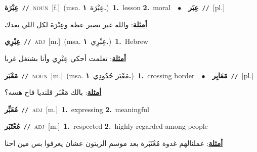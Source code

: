 \documentclass[10pt,a4paper,twoside]{article} %
\begin{document}
\begin{multicols}{2}
{\setlength\topsep{0pt}\textbf{\foreignlanguage{arabic}{عِبْرَة}}\ {\color{gray}\texttt{//}\color{black}}\ \textsc{noun}\ [f.]\ \color{gray}(msa. \foreignlanguage{arabic}{عِبْرَة}~\foreignlanguage{arabic}{\textbf{١.}})\color{black}\ \textbf{1.}~lesson  \textbf{2.}~moral\ \ $\bullet$\ \ \setlength\topsep{0pt}\textbf{\foreignlanguage{arabic}{عِبَر}}\ {\color{gray}\texttt{//}\color{black}}\ [pl.]\  \begin{flushright}\color{gray}\foreignlanguage{arabic}{\textbf{\underline{\foreignlanguage{arabic}{أمثلة}}}: والله غير تصير عظة وعِبْرَة لكل اللي بعدك}\end{flushright}\color{black}} \vspace{2mm}

{\setlength\topsep{0pt}\textbf{\foreignlanguage{arabic}{عِبْرِي}}\ {\color{gray}\texttt{//}\color{black}}\ \textsc{adj}\ [m.]\ \color{gray}(msa. \foreignlanguage{arabic}{عِبْرِي}~\foreignlanguage{arabic}{\textbf{١.}})\color{black}\ \textbf{1.}~Hebrew\  \begin{flushright}\color{gray}\foreignlanguage{arabic}{\textbf{\underline{\foreignlanguage{arabic}{أمثلة}}}: تعلمت أحكي عِبْرِي وأنا بشتغل غربا}\end{flushright}\color{black}} \vspace{2mm}

{\setlength\topsep{0pt}\textbf{\foreignlanguage{arabic}{مَعْبَر}}\ {\color{gray}\texttt{//}\color{black}}\ \textsc{noun}\ [m.]\ \color{gray}(msa. \foreignlanguage{arabic}{مَعْبَر حُدُودِي}~\foreignlanguage{arabic}{\textbf{١.}})\color{black}\ \textbf{1.}~crossing border\ \ $\bullet$\ \ \setlength\topsep{0pt}\textbf{\foreignlanguage{arabic}{مَعَابِر}}\ {\color{gray}\texttt{//}\color{black}}\ [pl.]\  \begin{flushright}\color{gray}\foreignlanguage{arabic}{\textbf{\underline{\foreignlanguage{arabic}{أمثلة}}}: بالك مَعْبَر قلنديا فاح هسه؟}\end{flushright}\color{black}} \vspace{2mm}

{\setlength\topsep{0pt}\textbf{\foreignlanguage{arabic}{مُعَبِّر}}\ {\color{gray}\texttt{//}\color{black}}\ \textsc{adj}\ [m.]\ \textbf{1.}~expressing  \textbf{2.}~meaningful\ } \vspace{2mm}

{\setlength\topsep{0pt}\textbf{\foreignlanguage{arabic}{مُعْتَبَر}}\ {\color{gray}\texttt{//}\color{black}}\ \textsc{adj}\ [m.]\ \textbf{1.}~respected  \textbf{2.}~highly-regarded among people\  \begin{flushright}\color{gray}\foreignlanguage{arabic}{\textbf{\underline{\foreignlanguage{arabic}{أمثلة}}}: عملنالهم غدوة مُعْتَبَرة بعد موسم الزيتون عشان يعرفوا بس مين احنا}\end{flushright}\color{black}} \vspace{2mm}


\end{multicols}
\end{document}
